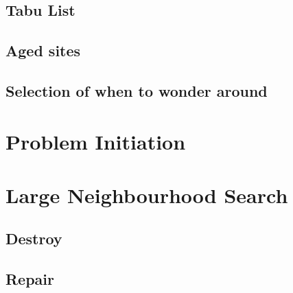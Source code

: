 \subsection{Tabu List}


\subsection{Aged sites}


\subsection{Selection of when to wonder around}



\section{Problem Initiation}



\section{Large Neighbourhood Search}

\subsection{Destroy}



\subsection{Repair}



